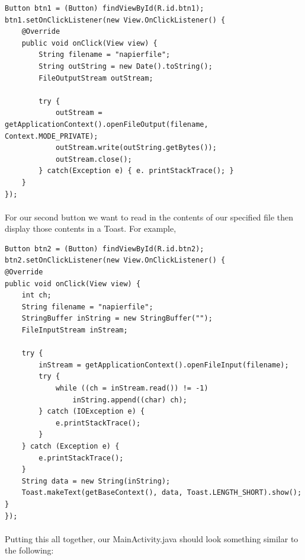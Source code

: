 \begin{lstlisting}
Button btn1 = (Button) findViewById(R.id.btn1);
btn1.setOnClickListener(new View.OnClickListener() {
    @Override
    public void onClick(View view) {
        String filename = "napierfile";
        String outString = new Date().toString();
        FileOutputStream outStream;

        try {
            outStream = getApplicationContext().openFileOutput(filename, Context.MODE_PRIVATE);
            outStream.write(outString.getBytes());
            outStream.close();
        } catch(Exception e) { e. printStackTrace(); }
    }
});
\end{lstlisting}

\paragraph{} For our second button we want to read in the contents of our specified file then display those contents in a Toast. For example,

\begin{lstlisting}
Button btn2 = (Button) findViewById(R.id.btn2);
btn2.setOnClickListener(new View.OnClickListener() {
@Override
public void onClick(View view) {
    int ch;
    String filename = "napierfile";
    StringBuffer inString = new StringBuffer("");
    FileInputStream inStream;

    try {
        inStream = getApplicationContext().openFileInput(filename);
        try {
            while ((ch = inStream.read()) != -1)
                inString.append((char) ch);
        } catch (IOException e) {
            e.printStackTrace();
        }
    } catch (Exception e) {
        e.printStackTrace();
    }
    String data = new String(inString);
    Toast.makeText(getBaseContext(), data, Toast.LENGTH_SHORT).show();
}
});
\end{lstlisting}

\paragraph{} Putting this all together, our MainActivity.java should look something similar to the following:

